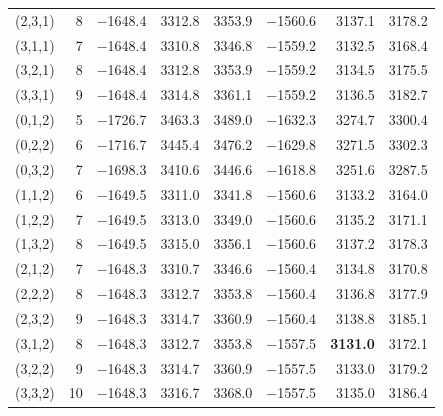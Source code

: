 \begin{tabular}{lrrrrrrr}
(2,3,1) & 8 & $-$1648.4 & 3312.8 & 3353.9 & $-$1560.6 & 3137.1 & 3178.2 \\
(3,1,1) & 7 & $-$1648.4 & 3310.8 & 3346.8 & $-$1559.2 & 3132.5 & 3168.4 \\
(3,2,1) & 8 & $-$1648.4 & 3312.8 & 3353.9 & $-$1559.2 & 3134.5 & 3175.5 \\
(3,3,1) & 9 & $-$1648.4 & 3314.8 & 3361.1 & $-$1559.2 & 3136.5 & 3182.7 \\
\addlinespace
(0,1,2) & 5 & $-$1726.7 & 3463.3 & 3489.0 & $-$1632.3 & 3274.7 & 3300.4 \\
(0,2,2) & 6 & $-$1716.7 & 3445.4 & 3476.2 & $-$1629.8 & 3271.5 & 3302.3 \\
(0,3,2) & 7 & $-$1698.3 & 3410.6 & 3446.6 & $-$1618.8 & 3251.6 & 3287.5 \\
(1,1,2) & 6 & $-$1649.5 & 3311.0 & 3341.8 & $-$1560.6 & 3133.2 & 3164.0 \\
(1,2,2) & 7 & $-$1649.5 & 3313.0 & 3349.0 & $-$1560.6 & 3135.2 & 3171.1 \\
(1,3,2) & 8 & $-$1649.5 & 3315.0 & 3356.1 & $-$1560.6 & 3137.2 & 3178.3 \\
(2,1,2) & 7 & $-$1648.3 & 3310.7 & 3346.6 & $-$1560.4 & 3134.8 & 3170.8 \\
(2,2,2) & 8 & $-$1648.3 & 3312.7 & 3353.8 & $-$1560.4 & 3136.8 & 3177.9 \\
(2,3,2) & 9 & $-$1648.3 & 3314.7 & 3360.9 & $-$1560.4 & 3138.8 & 3185.1 \\
(3,1,2) & 8 & $-$1648.3 & 3312.7 & 3353.8 & $-$1557.5 & \textbf{3131.0} & 3172.1 \\
(3,2,2) & 9 & $-$1648.3 & 3314.7 & 3360.9 & $-$1557.5 & 3133.0 & 3179.2 \\
(3,3,2) & 10 & $-$1648.3 & 3316.7 & 3368.0 & $-$1557.5 & 3135.0 & 3186.4 \\
\bottomrule
\end{tabular}